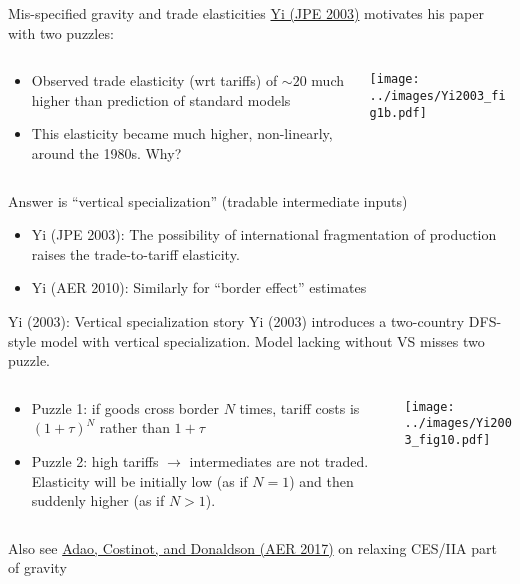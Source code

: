 \documentclass[10pt,notes=hide,aspectratio=169]{beamer}
\begin{document}
\begin{frame}{Mis-specified gravity and trade elasticities}
\href{https://doi.org/10.1086/344805}{Yi (JPE 2003)} motivates his paper with two puzzles:
\begin{columns}
\begin{column}{.49\textwidth}
\begin{itemize}
\item Observed trade elasticity (wrt tariffs) of $\sim 20$ much higher than prediction of standard models
\item This elasticity became much higher, non-linearly, around the 1980s. Why?
\end{itemize}
\end{column}
\begin{column}{.5\textwidth}
\texttt{[image: ../images/Yi2003\_fig1b.pdf]}
\end{column}
\end{columns}
\vspace{2mm}
Answer is ``vertical specialization'' (tradable intermediate inputs)
\begin{itemize}
	\item Yi (JPE 2003): The possibility of international fragmentation of production raises the trade-to-tariff elasticity.
	\item Yi (AER 2010): Similarly for ``border effect'' estimates
\end{itemize}
\end{frame}
\begin{frame}{Yi (2003): Vertical specialization story}
Yi (2003) introduces a two-country DFS-style model with vertical specialization. Model lacking without VS misses two puzzle.
\begin{columns}
\begin{column}{.46\textwidth}
\begin{itemize}
	\item Puzzle 1: if goods cross border $N$ times,
	tariff costs is $(1+\tau)^N$ rather than $1+\tau$
	\item Puzzle 2: high tariffs $\to$ intermediates are not traded.
	Elasticity will be initially low (as if $N = 1$) and then suddenly higher (as if $N > 1$).
\end{itemize}
\end{column}
\begin{column}{.52\textwidth}
\texttt{[image: ../images/Yi2003\_fig10.pdf]}
\end{column}
\end{columns}
Also see \href{https://www.aeaweb.org/articles?id=10.1257/aer.20150956}{Adao, Costinot, and Donaldson (AER 2017)} on relaxing CES/IIA part of gravity
\end{frame}
\end{document}
